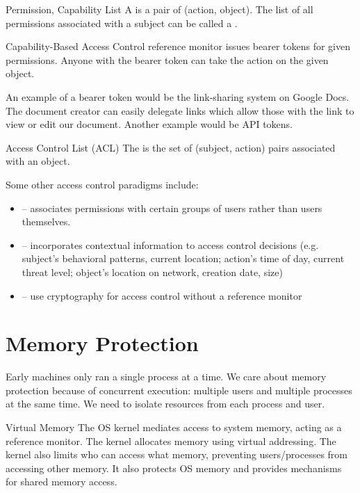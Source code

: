 \documentclass[12pt]{report}
\begin{document}
\begin{dfnbox}{Permission, Capability List}{}
    A  is a pair of (action, object). The list of all permissions associated with a subject can be called a .
\end{dfnbox}

\begin{dfnbox}{Capability-Based Access Control}{}
     reference monitor issues bearer tokens for given permissions. Anyone with the bearer token can take the action on the given object.
\end{dfnbox}

An example of a bearer token would be the link-sharing system on Google Docs. The document creator can easily delegate links which allow those with the link to view or edit our document. Another example would be API tokens.

\begin{dfnbox}{Access Control List (ACL)}{}
    The  is the set of (subject, action) pairs associated with an object.
\end{dfnbox}

Some other access control paradigms include:
\begin{itemize}
    \item {} -- associates permissions with certain groups of users rather than users themselves.
    \item {} -- incorporates contextual information to access control decisions (e.g. subject's behavioral patterns, current location; action's time of day, current threat level; object's location on network, creation date, size)
    \item {} -- use cryptography for access control without a reference monitor
\end{itemize}

\section{Memory Protection}
Early machines only ran a single process at a time. We care about memory protection because of concurrent execution: multiple users and multiple processes at the same time. We need to isolate resources from each process and user.

\begin{dfnbox}{Virtual Memory}{}
The OS kernel mediates access to system memory, acting as a reference monitor. The kernel allocates memory using virtual addressing. The kernel also limits who can access what memory, preventing users/processes from accessing other memory. It also protects OS memory and provides mechanisms for shared memory access.
\end{dfnbox}
\end{document}
